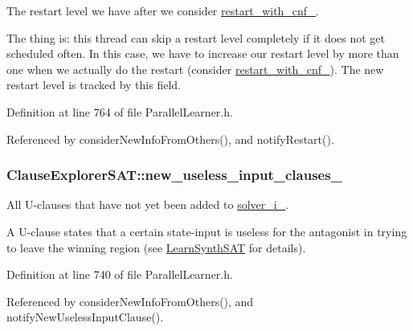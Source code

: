 The restart level we have after we consider \hyperlink{classClauseExplorerSAT_a1a9dc7f76967c8164e9625df34dec172}{restart\-\_\-with\-\_\-cnf\-\_\-}. 

The thing is\-: this thread can skip a restart level completely if it does not get scheduled often. In this case, we have to increase our restart level by more than one when we actually do the restart (consider \hyperlink{classClauseExplorerSAT_a1a9dc7f76967c8164e9625df34dec172}{restart\-\_\-with\-\_\-cnf\-\_\-}). The new restart level is tracked by this field. 

Definition at line 764 of file Parallel\-Learner.\-h.



Referenced by consider\-New\-Info\-From\-Others(), and notify\-Restart().

\hypertarget{classClauseExplorerSAT_a3d1bdb9a6484c85af655a4eed1ee5f19}{
\subsubsection[{new\-\_\-useless\-\_\-input\-\_\-clauses\-\_\-}]{ Clause\-Explorer\-S\-A\-T\-::new\-\_\-useless\-\_\-input\-\_\-clauses\-\_\-\hspace{0.3cm}{\ttfamily [protected]}}}\label{classClauseExplorerSAT_a3d1bdb9a6484c85af655a4eed1ee5f19}


All U-\/clauses that have not yet been added to \hyperlink{classClauseExplorerSAT_a65b5b3d04ff5be8bfec60d3dcf86e4d0}{solver\-\_\-i\-\_\-}. 

A U-\/clause states that a certain state-\/input is useless for the antagonist in trying to leave the winning region (see \hyperlink{classLearnSynthSAT}{Learn\-Synth\-S\-A\-T} for details). 

Definition at line 740 of file Parallel\-Learner.\-h.



Referenced by consider\-New\-Info\-From\-Others(), and notify\-New\-Useless\-Input\-Clause().

